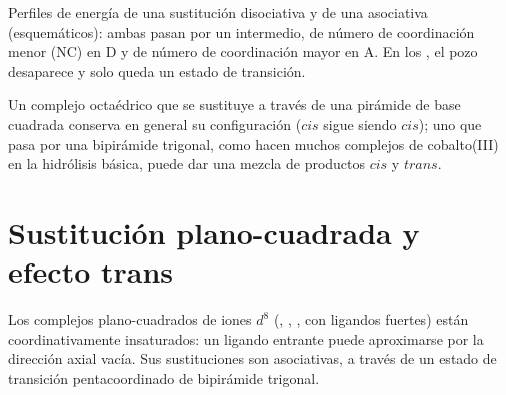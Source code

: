\begin{omfigure}

{\small Perfiles de energía de una sustitución disociativa y de una asociativa
(esquemáticos): ambas pasan por un intermedio, de número de coordinación menor
(NC) en D y de número de coordinación mayor en A. En los ,
el pozo desaparece y solo queda un estado de transición.}
\end{omfigure}

Un complejo octaédrico que se sustituye a través de una pirámide de base cuadrada conserva
en general su configuración ($cis$ sigue siendo $cis$); uno que pasa por una bipirámide
trigonal, como hacen muchos complejos de cobalto(III) en la hidrólisis básica, puede dar una
mezcla de productos $cis$ y $trans$.

\section{Sustitución plano-cuadrada y efecto trans}

Los complejos plano-cuadrados de iones $d^8$ (, , ,  con ligandos fuertes)
están coordinativamente insaturados: un ligando entrante puede aproximarse por la
dirección axial vacía. Sus sustituciones son asociativas, a través de un
estado de transición pentacoordinado de bipirámide trigonal.

